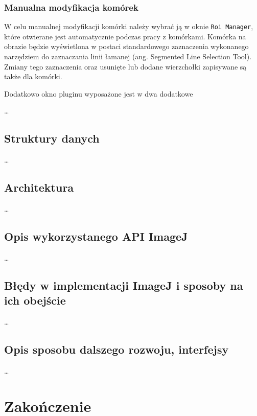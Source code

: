 \documentclass[declaration,shortabstract,mgr]{iithesis}
\begin{document}
\subsection{Manualna modyfikacja komórek}

W celu manualnej modyfikacji komórki należy wybrać ją w oknie \texttt{Roi Manager}, które otwierane jest automatycznie podczas pracy z komórkami. Komórka na obrazie będzie wyświetlona w postaci standardowego zaznaczenia wykonanego narzędziem do zaznaczania linii łamanej (ang. Segmented Line Selection Tool)\cite{imagej:segmented-line}. Zmiany tego zaznaczenia oraz usunięte lub dodane wierzchołki zapisywane są także dla komórki.

Dodatkowo okno pluginu wyposażone jest w dwa dodatkowe 

\ldots %

\section{Struktury danych}
\ldots %
\section{Architektura}
\ldots %
\section{Opis wykorzystanego API ImageJ}
\ldots %
\section{Błędy w implementacji ImageJ i sposoby na ich obejście}
\ldots %
\section{Opis sposobu dalszego rozwoju, interfejsy}
\ldots %



\chapter{Zakończenie}

\end{document}
